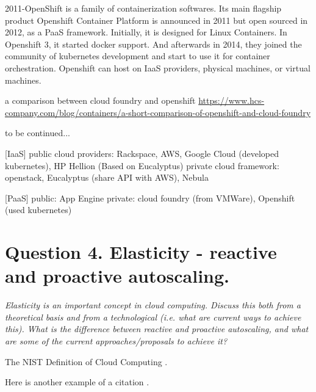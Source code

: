 \documentclass[a4paper,12pt]{article}
\begin{document}
2011-OpenShift is a family of containerization softwares. Its main flagship product Openshift Container Platform is announced in 2011 but open sourced in 2012, as a PaaS framework. Initially, it is designed for Linux Containers. In Openshift 3, it started docker support. And afterwards in 2014, they joined the community of kubernetes development and start to use it for container orchestration. Openshift can host on IaaS providers, physical machines, or virtual machines.  

a comparison between cloud foundry and openshift
\url{https://www.hcs-company.com/blog/containers/a-short-comparison-of-openshift-and-cloud-foundry}

to be continued...

[IaaS]
public cloud providers: Rackspace, AWS, Google Cloud (developed kubernetes), HP Hellion (Based on Eucalyptus)
private cloud framework: openstack, Eucalyptus (share API with AWS), Nebula

[PaaS]
public: App Engine
private: cloud foundry (from VMWare), Openshift (used kubernetes)


\newpage
\section{Question 4. Elasticity - reactive and proactive autoscaling.}
\textit{Elasticity is an important concept in cloud computing. Discuss this both from a
theoretical basis and from a technological (i.e. what are current ways to achieve
this). What is the difference between reactive and proactive autoscaling, and what
are some of the current approaches/proposals to achieve it?}

The NIST Definition of Cloud Computing \cite{nist}.

Here is another example of a citation \cite{fog}.
\end{document}
